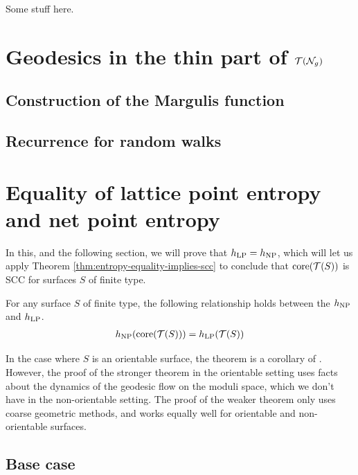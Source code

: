 \documentclass[12pt, reqno]{amsart}
\begin{document}
{\color{red} Some stuff here.}

\section{Geodesics in the thin part of $\mathcal{T}(\mathcal{N}_g)$}
\label{sec:recurr-rand-walks}


\subsection{Construction of the Margulis function}
\label{sec:constr-marg-funct}

\subsection{Recurrence for random walks}
\label{sec:recurr-rand-walks-1}

\section{Equality of lattice point entropy and net point entropy}
\label{sec:equal-latt-point}


In this, and the following section, we will prove that $h_{\mathrm{LP}} = h_{\mathrm{NP}}$, which will let us apply Theorem \ref{thm:entropy-equality-implies-scc} to conclude that $\mathrm{core}(\mathcal{T}(S))$ is SCC for surfaces $S$ of finite type.
\begin{theorem}
  \label{thm:entropy-equality}
  For any surface $S$ of finite type, the following relationship holds between the $h_{\mathrm{NP}}$ and $h_{\mathrm{LP}}$.
  \begin{align*}
    h_{\mathrm{NP}}(\mathrm{core}(\mathcal{T}(S))) = h_{\mathrm{LP}}(\mathcal{T}(S))
  \end{align*}
\end{theorem}

\begin{rem}
  In the case where $S$ is an orientable surface, the theorem is a corollary of \textcite[Theorem 1.2]{10.1215/00127094-1548443}.
  However, the proof of the stronger theorem in the orientable setting uses facts about the dynamics of the geodesic flow on the moduli space, which we don't have in the non-orientable setting.
  The proof of the weaker theorem only uses coarse geometric methods, and works equally well for orientable and non-orientable surfaces.
\end{rem}

\subsection{Base case}
\label{sec:base-case}
\end{document}
